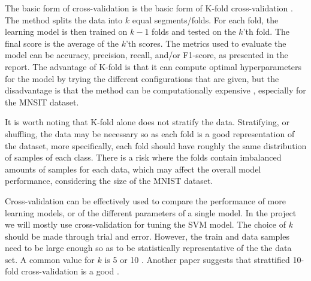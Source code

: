 The basic form of cross-validation is the basic form of K-fold cross-validation \cite{Refaeilzadeh2009}. The method splits the data into $k$ equal segments/folds. For each fold, the learning model is then trained on $k-1$ folds and tested on the $k$'th fold. The final score is the average of the $k$'th scores. The metrics used to evaluate the model can be accuracy, precision, recall, and/or F1-score, as presented in the report. The advantage of K-fold is that it can compute optimal hyperparameters for the model by trying the different configurations that are given, but the disadvantage is that the method can be computationally expensive \cite{scikit-learn}, especially for the MNSIT dataset.


It is worth noting that K-fold alone does not stratify the data. Stratifying, or shuffling, the data may be necessary so as each fold is a good representation of the dataset, more specifically, each fold should have roughly the same distribution of samples of each class. There is a risk where the folds contain imbalanced amounts of samples for each data, which may affect the overall model performance, considering the size of the MNIST dataset.



Cross-validation can be effectively used to compare the performance of more learning models, or of the different parameters of a single model. In the project we will mostly use cross-validation for tuning the SVM model. The choice of $k$ should be made through trial and error. However, the train and data samples need to be large enough so as to be statistically representative of the the data set. A common value for $k$ is 5 or 10 \cite{introduction-to-statistical-learning}. Another paper suggests that strattified 10-fold cross-validation is a good \cite{Refaeilzadeh2009} \cite{kohavi1995study}.




